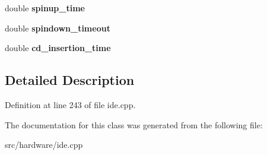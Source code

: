 \begin{DoxyCompactItemize}
\item 
\hypertarget{classIDEController_a8fdce66e9764893c0d4bc4df2d03d80e}{double {\bfseries spinup\-\_\-time}}\label{classIDEController_a8fdce66e9764893c0d4bc4df2d03d80e}

\item 
\hypertarget{classIDEController_a88ffb339927b63d3bf7acdfa4055bb7a}{double {\bfseries spindown\-\_\-timeout}}\label{classIDEController_a88ffb339927b63d3bf7acdfa4055bb7a}

\item 
\hypertarget{classIDEController_a783a444006b92bb95370f2976cd1239f}{double {\bfseries cd\-\_\-insertion\-\_\-time}}\label{classIDEController_a783a444006b92bb95370f2976cd1239f}

\end{DoxyCompactItemize}


\subsection{Detailed Description}


Definition at line 243 of file ide.\-cpp.



The documentation for this class was generated from the following file\-:\begin{DoxyCompactItemize}
\item 
src/hardware/ide.\-cpp\end{DoxyCompactItemize}

